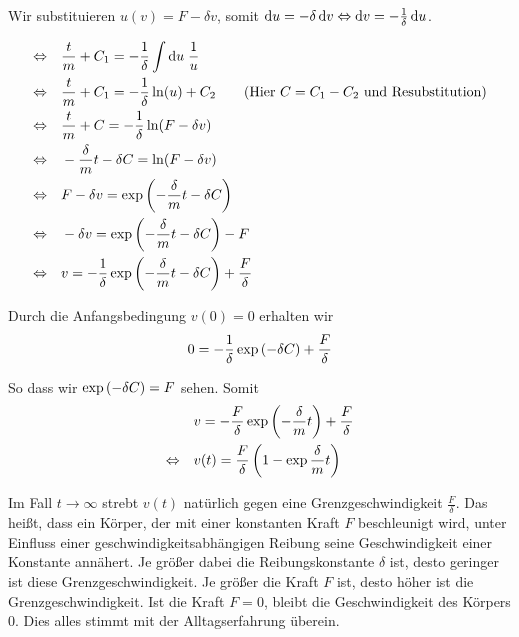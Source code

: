 \documentclass[a4paper,german,12pt,smallheadings]{scrartcl}
\begin{document}
Wir substituieren $u(v) = F - \delta v$, somit $\dif u = - \delta \dif v
\Leftrightarrow \dif v = -\frac{1}{\delta} \dif u$.

\begin{align}
  \Leftrightarrow\quad
  &\frac{t}{m} + C_1 = - \frac{1}{\delta} \int \dif u \; \frac{1}{u} \\
  \Leftrightarrow\quad
  &\frac{t}{m} + C_1 = - \frac{1}{\delta} \ln(u) + C_2 \qquad \text{(Hier $C = C_1 - C_2$  und Resubstitution)} \\
  \Leftrightarrow\quad
  &\frac{t}{m} + C = - \frac{1}{\delta} \ln(F - \delta v) \\
  \Leftrightarrow\quad
  &-\frac{\delta}{m} t -\delta C = \ln(F - \delta v) \\
  \Leftrightarrow\quad
  &F - \delta v = \exp \del{-\frac{\delta}{m} t - \delta C} \\
  \Leftrightarrow\quad
  &- \delta v = \exp \del{-\frac{\delta}{m} t - \delta C} - F \\
  \Leftrightarrow\quad
  &v = -\frac{1}{\delta} \exp \del{-\frac{\delta}{m} t - \delta C} + \frac{F}{\delta} \\
\end{align}

Durch die Anfangsbedingung $v(0) = 0$ erhalten wir
\begin{equation}
  0 = -\frac{1}{\delta} \exp \del{- \delta C} + \frac{F}{\delta}
\end{equation}

So dass wir $\exp\del{-\delta C} = F$ sehen. Somit
\begin{align}
  &v = -\frac{F}{\delta} \exp \del{-\frac{\delta}{m} t} + \frac{F}{\delta} \\
  \Leftrightarrow\quad
  &v(t) = \frac{F}{\delta} \del{1 - \exp{\frac{\delta}{m} t}}
\end{align}

Im Fall $t \to \infty$ strebt $v(t)$ natürlich gegen eine Grenzgeschwindigkeit
$\frac{F}{\delta}$.  Das heißt, dass ein Körper, der mit einer konstanten Kraft
$F$ beschleunigt wird, unter Einfluss einer geschwindigkeitsabhängigen Reibung
seine Geschwindigkeit einer Konstante annähert. Je größer dabei die
Reibungskonstante $\delta$ ist, desto geringer ist diese Grenzgeschwindigkeit.
Je größer die Kraft $F$ ist, desto höher ist die Grenzgeschwindigkeit. Ist die
Kraft $F = 0$, bleibt die Geschwindigkeit des Körpers $0$. Dies alles stimmt
mit der Alltagserfahrung überein.
\end{document}
